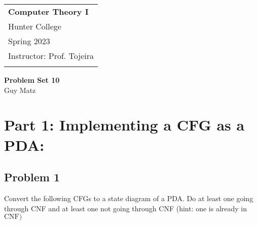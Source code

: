 \documentclass[12pt]{scrbook}
\author{Guy Matz}
\begin{document}
\begin{tabular}{p{15.5cm}}
    {\large \textbf{Computer Theory I}} \\
  Hunter College \\
  Spring 2023  \\
  Instructor: Prof. Tojeira\\
  \hline
  \\
\end{tabular}

\begin{center}
  {\Large \textbf{Problem Set 10}}
  \vspace{2mm}\\
  Guy Matz
\end{center}

\section*{Part 1: Implementing a CFG as a PDA:}
\vspace{0.4cm}
\subsection*{Problem 1}
Convert the following CFGs to a state diagram of a PDA. Do at least one going through CNF and at least one not going through CNF (hint: one is already in $\mathrm{CNF})$

\end{document}
